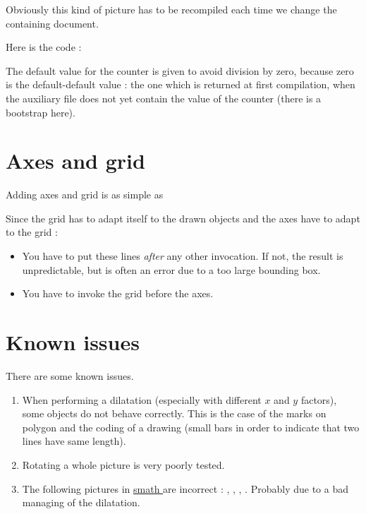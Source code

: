 Obviously this kind of picture has to be recompiled each time we change the containing document.

Here is the code :



The default value for the  counter is given to avoid division by zero, because zero is the default-default value : the one which is returned at first compilation, when the auxiliary file does not yet contain the value of the counter (there is a bootstrap here).

\section{Axes and grid}

Adding axes and grid is as simple as



Since the grid has to adapt itself to the drawn objects and the axes have to adapt to the grid :
\begin{itemize}
    \item You have to put these lines \emph{after} any other  invocation. If not, the result is unpredictable, but is often an error due to a too large bounding box.
    \item You have to invoke the grid before the axes.
\end{itemize}

\section{Known issues}

There are some known issues.
\begin{enumerate}
    \item
        When performing a dilatation (especially with different \( x\) and \( y\) factors), some objects do not behave correctly. This is the case of the marks on polygon and the coding of a drawing (small bars in order to indicate that two lines have same length).
    \item
        Rotating a whole picture is very poorly tested.
    \item The following pictures in \href{ http://laurent.claessens-donadello.eu/smath.pdf }{ smath } are incorrect :  ,  ,  ,  . Probably due to a bad managing of the dilatation.
\end{enumerate}
